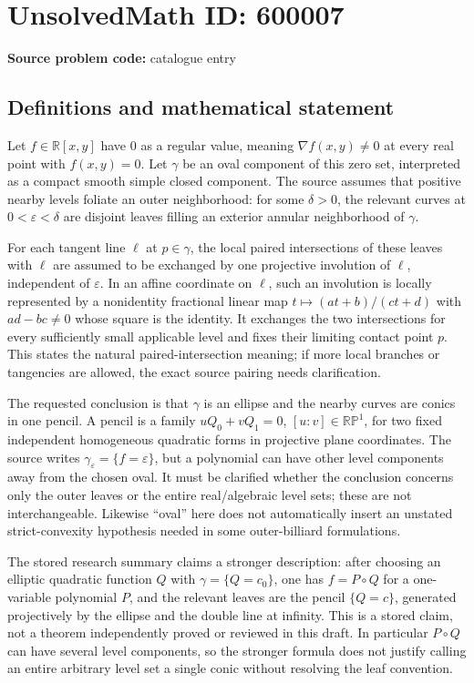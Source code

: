 \documentclass[11pt]{article}
\newcommand{\R}{\mathbb{R}}
\begin{document}
\section*{UnsolvedMath ID: 600007}
\textbf{Source problem code:} catalogue entry
\subsection{Definitions and mathematical statement}
Let $f\in\R[x,y]$ have $0$ as a regular value, meaning $\nabla f(x,y)\ne0$ at every real point with $f(x,y)=0$. Let $\gamma$ be an oval component of this zero set, interpreted as a compact smooth simple closed component. The source assumes that positive nearby levels foliate an outer neighborhood: for some $\delta>0$, the relevant curves at $0<\varepsilon<\delta$ are disjoint leaves filling an exterior annular neighborhood of $\gamma$.

For each tangent line $\ell$ at $p\in\gamma$, the local paired intersections of these leaves with $\ell$ are assumed to be exchanged by one projective involution of $\ell$, independent of $\varepsilon$. In an affine coordinate on $\ell$, such an involution is locally represented by a nonidentity fractional linear map $t\mapsto(at+b)/(ct+d)$ with $ad-bc\ne0$ whose square is the identity. It exchanges the two intersections for every sufficiently small applicable level and fixes their limiting contact point $p$. This states the natural paired-intersection meaning; if more local branches or tangencies are allowed, the exact source pairing needs clarification.

The requested conclusion is that $\gamma$ is an ellipse and the nearby curves are conics in one pencil. A pencil is a family $uQ_0+vQ_1=0$, $[u:v]\in\mathbb{RP}^1$, for two fixed independent homogeneous quadratic forms in projective plane coordinates. The source writes $\gamma_\varepsilon=\{f=\varepsilon\}$, but a polynomial can have other level components away from the chosen oval. It must be clarified whether the conclusion concerns only the outer leaves or the entire real/algebraic level sets; these are not interchangeable. Likewise ``oval'' here does not automatically insert an unstated strict-convexity hypothesis needed in some outer-billiard formulations.

The stored research summary claims a stronger description: after choosing an elliptic quadratic function $Q$ with $\gamma=\{Q=c_0\}$, one has $f=P\circ Q$ for a one-variable polynomial $P$, and the relevant leaves are the pencil $\{Q=c\}$, generated projectively by the ellipse and the double line at infinity. This is a stored claim, not a theorem independently proved or reviewed in this draft. In particular $P\circ Q$ can have several level components, so the stronger formula does not justify calling an entire arbitrary level set a single conic without resolving the leaf convention.
\end{document}
